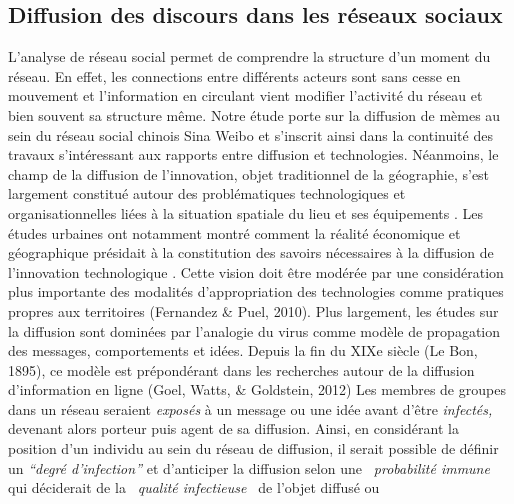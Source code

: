 \subsection[Diffusion des discours dans les r\'eseaux sociaux]{Diffusion des discours dans les r\'eseaux sociaux}
L{\textquoteright}analyse de r\'eseau social permet de comprendre la
structure d{\textquoteright}un moment du r\'eseau. En effet, les
connections entre diff\'erents acteurs sont sans cesse en mouvement et
l{\textquoteright}information en circulant vient modifier
l{\textquoteright}activit\'e du r\'eseau et bien souvent sa structure
m\^eme. Notre \'etude porte sur la diffusion de m\`emes au sein du
r\'eseau social chinois Sina Weibo et s{\textquoteright}inscrit ainsi
dans la continuit\'e des travaux s{\textquoteright}int\'eressant aux
rapports entre diffusion et technologies. N\'eanmoins, le champ de la
diffusion de l{\textquoteright}innovation, objet traditionnel de la
g\'eographie, s{\textquoteright}est largement constitu\'e autour des
probl\'ematiques technologiques et organisationnelles li\'ees \`a la
situation spatiale du lieu et ses \'equipements \cite{Crevoisier2004}. Les
\'etudes urbaines ont notamment montr\'e comment la r\'ealit\'e
\'economique et g\'eographique pr\'esidait \`a la constitution des
savoirs n\'ecessaires \`a la diffusion de l{\textquoteright}innovation
technologique \cite{Howells2002}. Cette vision doit \^etre mod\'er\'ee par
une consid\'eration plus importante des modalit\'es
d{\textquoteright}appropriation des technologies comme pratiques
propres aux territoires (Fernandez \& Puel, 2010). Plus largement, les
\'etudes sur la diffusion sont domin\'ees par
l{\textquoteright}analogie du virus comme mod\`ele de propagation des
messages, comportements et id\'ees. Depuis la fin du XIXe si\`ecle (Le
Bon, 1895), ce mod\`ele est pr\'epond\'erant dans les recherches autour
de la diffusion d{\textquoteright}information en ligne (Goel, Watts, \&
Goldstein, 2012) Les membres de groupes dans un r\'eseau seraient
\textit{expos\'es }\`a un message ou une id\'ee avant
d{\textquoteright}\^etre \textit{infect\'es, }devenant alors porteur
puis agent de sa diffusion. Ainsi, en consid\'erant la position
d{\textquoteright}un individu au sein du r\'eseau de diffusion, il
serait possible de d\'efinir un
\textit{{\textquotedblleft}}\textit{degr\'e
d{\textquoteright}infection{\textquotedblright}} \cite{Cheng et al.2013}
et d{\textquoteright}anticiper la diffusion selon une
\textit{{\guillemotleft}~probabilit\'e immune~{\guillemotright}
}qui\textit{ }d\'eciderait de la \textit{{\guillemotleft}~qualit\'e
infectieuse~{\guillemotright} }de l{\textquoteright}objet diffus\'e ou
